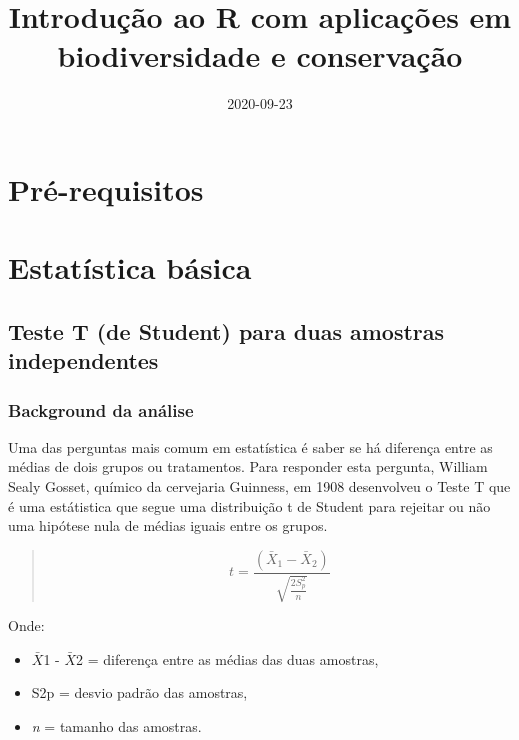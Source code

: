 \documentclass[
]{book}
\title{Introdução ao R com aplicações em biodiversidade e conservação}
\author{}
\date{\vspace{-2.5em}2020-09-23}
\begin{document}
\maketitle

{
\setcounter{tocdepth}{1}
\tableofcontents
}
\hypertarget{pruxe9-requisitos}{%
\chapter{Pré-requisitos}\label{pruxe9-requisitos}}

\hypertarget{estatuxedstica-buxe1sica}{%
\chapter{Estatística básica}\label{estatuxedstica-buxe1sica}}

\hypertarget{teste-t-de-student-para-duas-amostras-independentes}{%
\section{Teste T (de Student) para duas amostras independentes}\label{teste-t-de-student-para-duas-amostras-independentes}}

\hypertarget{background-da-anuxe1lise}{%
\subsection{Background da análise}\label{background-da-anuxe1lise}}

Uma das perguntas mais comum em estatística é saber se há diferença entre as médias de dois grupos ou tratamentos. Para responder esta pergunta, William Sealy Gosset, químico da cervejaria Guinness, em 1908 desenvolveu o Teste T que é uma estátistica que segue uma distribuição t de Student para rejeitar ou não uma hipótese nula de médias iguais entre os grupos.

\begin{quote}
\[ t = \frac{(\bar{X}_1 - \bar{X}_2)}{\sqrt{\frac{2S^2_p}{n}}}\]
\end{quote}

Onde:

\begin{itemize}
\item
  \(\bar{X}\)1 - \(\bar{X}\)2 = diferença entre as médias das duas amostras,
\item
  S2p = desvio padrão das amostras,
\item
  \emph{n} = tamanho das amostras.
\end{itemize}
\end{document}
